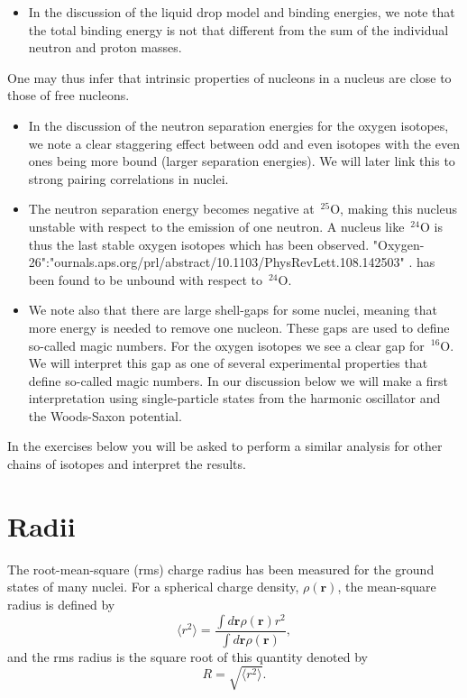 \documentclass[%
twoside,                 %
final,                   %
10pt]{article}
\begin{document}
\begin{itemize}
\item In the discussion of the liquid drop model and binding energies, we note that the total binding energy is not that different from the sum of the individual neutron and proton masses. 
\end{itemize}

\noindent
One may thus infer that intrinsic properties of nucleons in a nucleus are close to those of free nucleons.
\begin{itemize}
\item In the discussion of the neutron separation energies for the oxygen isotopes, we note  a clear staggering effect between odd and even isotopes with the even ones being more bound (larger separation energies). We will later link this to strong pairing correlations in nuclei.

\item The neutron separation energy becomes negative at $\,{}^{25}\mbox{O}$, making this nucleus unstable with respect to the emission of one neutron. A nucleus like $\,{}^{24}\mbox{O}$ is thus the last stable oxygen isotopes which has been observed. "Oxygen-26":"ournals.aps.org/prl/abstract/10.1103/PhysRevLett.108.142503" . has been found to be unbound with respect to $\,{}^{24}\mbox{O}$.

\item We note also that there are large shell-gaps for some nuclei, meaning that more energy is needed to remove one nucleon. These gaps are used to define so-called magic numbers. For the oxygen isotopes we see a clear gap for $\,{}^{16}\mbox{O}$. We will interpret this gap as one of several experimental properties that define so-called magic numbers. In our discussion below we will make a first interpretation using  single-particle states from the harmonic oscillator and the Woods-Saxon potential. 
\end{itemize}

\noindent
In the exercises below you will be asked to perform a similar analysis for other chains of isotopes and interpret the results. 



\section{Radii}

The root-mean-square (rms) charge radius has been measured for the ground states of many
nuclei. For a spherical charge density, $\rho(\bm{r})$, the mean-square radius is defined by
\[
\langle r^2\rangle = \frac{ \int  d \bm{r} \rho(\bm{r}) r^2}{ \int  d \bm{r} \rho(\bm{r})},
\]
and the rms radius is the square root of this quantity denoted by
\[
R =\sqrt{ \langle r^2\rangle}.
\]
\end{document}
